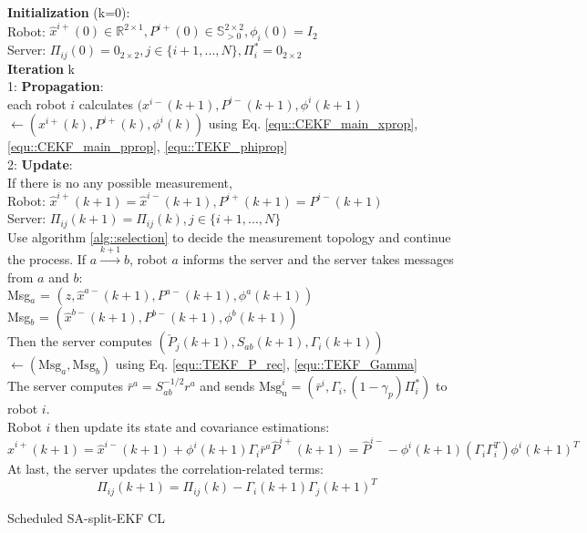 \documentclass[conference]{IEEEtran}
\begin{document}
\begin{algorithm}
	\textbf{Initialization} (k=0):\\
	Robot: $\hat{x}^{i+}(0)\in\mathbb{R}^{2\times1}, P^{i+}(0)\in\mathbb{S}^{2\times2}_{>0},\phi_i(0) = I_2$\\
	Server: $\Pi_{ij}(0) = 0_{2\times2},j\in\{i+1,...,N\}, \Pi_i^* = 0_{2\times2}$\\
	\textbf{Iteration} k\\
	1: \textbf{Propagation}: \\each robot $i$ calculates $(x^{i-}(k+1),P^{i-}(k+1),\phi^i(k+1)$ \\$\longleftarrow (x^{i+}(k),P^{i+}(k),\phi^i(k))$ using Eq. \eqref{equ::CEKF_main_xprop}, \eqref{equ::CEKF_main_pprop}, \eqref{equ::TEKF_phiprop} \vspace{1ex}\\
	2: \textbf{Update}:\\
	If there is no any possible measurement,\\
	Robot: $\hat{x}^{i+}(k+1)=\hat{x}^{i-}(k+1), P^{i+}(k+1)=P^{i-}(k+1)$\\
	Server: $\Pi_{ij}(k+1) = \Pi_{ij}(k),j\in\{i+1,...,N\}$ \vspace{1ex}\\
	Use algorithm \ref{alg::selection} to decide the measurement topology and continue the process.
	If $a\overset{k+1}{\longrightarrow}b$, robot $a$ informs the server and the server takes messages from $a$ and $b$:\\
	Msg$_a$ = $(z,\hat{x}^{a-}(k+1),P^{a-}(k+1),\phi^a(k+1))$ \\
	Msg$_b$ = $(\hat{x}^{b-}(k+1),P^{b-}(k+1),\phi^b(k+1))$ \vspace{0.5ex}\\
	Then the server computes $(\check{P}_j(k+1),S_{ab}(k+1),\Gamma_i(k+1))$ $\longleftarrow (\text{Msg}_a,\text{Msg}_b)$ using Eq. \eqref{equ::TEKF_P_rec}, \eqref{equ::TEKF_Gamma} \vspace{0.5ex} \\
	The server computes $\bar{r}^a = S_{ab}^{-1/2}r^a$ and sends $\text{Msg}_\text{u}^i = (\bar{r}^i,\Gamma_i,(1-\gamma_{p})\Pi_i^*)$ to robot $i$.\\
	Robot $i$ then update its state and covariance estimations:
	\begin{subequations}
		\begin{equation}
		\hat{x}^{i+}(k+1) = \hat{x}^{i-}(k+1) + \phi^i(k+1)\Gamma_i\bar{r}^a
		\end{equation}
		\begin{equation}
		\hat{P}^{i+}(k+1) = \hat{P}^{i-} - \phi^i(k+1)(\Gamma_i\Gamma_i^T)\phi^i(k+1)^T
		\end{equation}
	\end{subequations}
	At last, the server updates the correlation-related terms:
	\begin{equation}
	\Pi_{ij}(k+1) = \Pi_{ij}(k) - \Gamma_i(k+1)\Gamma_j(k+1)^T
	\end{equation}
	\caption{Scheduled SA-split-EKF CL}
	\label{alg::SA-TEKF}
\end{algorithm}
\end{document}
